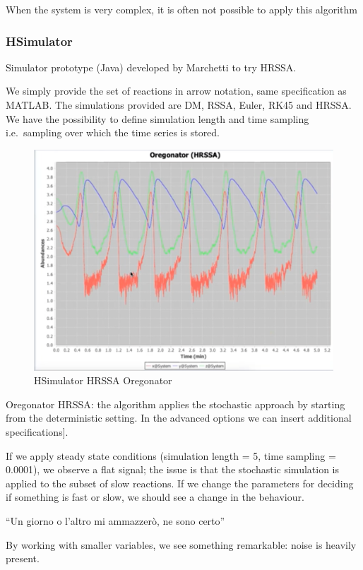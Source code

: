 When the system is very complex, it is often not possible to apply this
algorithm

\hypertarget{hsimulator}{%
\subsubsection{HSimulator}\label{hsimulator}}

Simulator prototype (Java) developed by Marchetti to try HRSSA.

We simply provide the set of reactions in arrow notation, same
specification as MATLAB. The simulations provided are DM, RSSA, Euler,
RK45 and HRSSA. We have the possibility to define simulation length and
time sampling i.e.~sampling over which the time series is stored.

\begin{figure}
\centering
\includegraphics{06_images/HRSSA_oregonator.png}
\caption{HSimulator HRSSA Oregonator}
\end{figure}

Oregonator HRSSA: the algorithm applies the stochastic approach by
starting from the deterministic setting. In the advanced options we can
insert additional specifications{]}.

If we apply steady state conditions (simulation length = 5, time
sampling = 0.0001), we observe a flat signal; the issue is that the
stochastic simulation is applied to the subset of slow reactions. If we
change the parameters for deciding if something is fast or slow, we
should see a change in the behaviour.

``Un giorno o l'altro mi ammazzerò, ne sono certo''

By working with smaller variables, we see something remarkable: noise is
heavily present.
